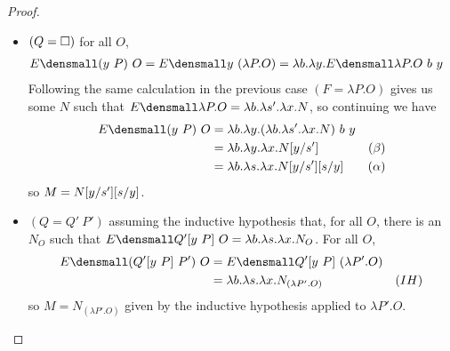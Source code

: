 \begin{proof}
\begin{enumerate}[(a)]
\begin{itemize}
      \begin{itemize}
      \item $(Q = \hole)$ for all $O$,
        \begin{align*}
          E\den{(y ~ P) ~ O}
          =
          E\den{y ~ (\lambda P. O)}
          &=
          \lambda b. \lambda y. E\den{\lambda P. O} ~ b ~ y
        \end{align*}
        Following the same calculation in the previous case $(F = \lambda P. O)$ gives us
        some $N$ such that $E\den{\lambda P. O} = \lambda b. \lambda s'. \lambda x. N$, so continuing we have
        \begin{align*}
          E\den{(y ~ P) ~ O}
          &=
          \lambda b. \lambda y. (\lambda b. \lambda s'. \lambda x. N) ~ b ~ y
          \\
          &=
          \lambda b. \lambda y. \lambda x. N\subst{s'}{y}
          &(\beta)
          \\
          &=
          \lambda b. \lambda s. \lambda x. N\subst{s'}{y}\subst{y}{s}
          &(\alpha)
        \end{align*}
        so $M = N\subst{s'}{y}\subst{y}{s}$.
      \item $(Q = Q' ~ P')$
        assuming the inductive hypothesis that,
        for all $O$, there is an $N_O$ such that
        $E\den{Q'[y ~ P] ~ O} = \lambda b. \lambda s. \lambda x. N_O$.
        For all $O$,
        \begin{align*}
          E\den{(Q'[y ~ P] ~ P') ~ O}
          &=
          E\den{Q'[y ~ P] ~ (\lambda P'. O)}
          \\
          &=
          \lambda b. \lambda s. \lambda x. N_{(\lambda P'. O)}
          &(IH)
        \end{align*}
        so $M = N_{(\lambda P'. O)}$ given by the inductive hypothesis applied to $\lambda P'. O$.
      \end{itemize}

\end{itemize}
\end{enumerate}
\end{proof}

